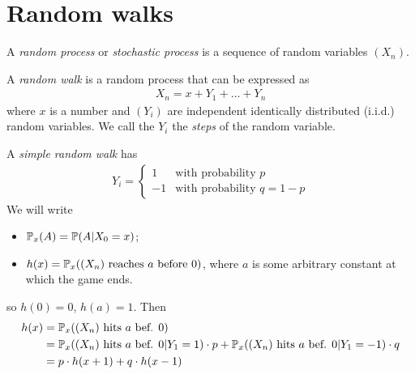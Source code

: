 \documentclass{../../template/note}
\begin{document}
    \section{Random walks}

    \begin{definition}
        A \emph{random process} or \emph{stochastic process} is a sequence of random variables \((X_n)\).
    \end{definition}
    
    \begin{definition}
        A \emph{random walk} is a random process that can be expressed as
        \begin{align*}
            X_n = x + Y_1 + \dots + Y_n
        \end{align*}
        where \(x\) is a number and \((Y_i)\) are independent identically distributed (i.i.d.) random variables. We call the \(Y_i\) the \emph{steps} of the random variable.         
    \end{definition}
    
    A \emph{simple random walk} has
    \begin{align*}
        Y_i = \begin{cases}
            1 & \text{with probability }p \\
            -1 & \text{with probability }q = 1-p
        \end{cases}
    \end{align*}
    We will write
    \begin{itemize}
        \item \(\mathbb P_x(A) = \mathbb P(A | X_0 = x)\);
        \item \(h(x) = \mathbb P_x((X_n) \text{ reaches } a \text{ before }0)\), where \(a\) is some arbitrary constant at which the game ends.
    \end{itemize}
    so \(h(0) = 0\), \(h(a) = 1\). Then
    \begin{align*}
        h(x) &= \mathbb P_x((X_n) \text{ hits } a \text{ bef. }0) \\
        &= \mathbb P_x((X_n) \text{ hits } a \text{ bef. }0 | Y_1 = 1) \cdot p + \mathbb P_x((X_n) \text{ hits } a \text{ bef. }0 | Y_1 = -1) \cdot q \\
        &= p \cdot h(x+1) + q \cdot h(x-1)
    \end{align*}

    
\end{document}

